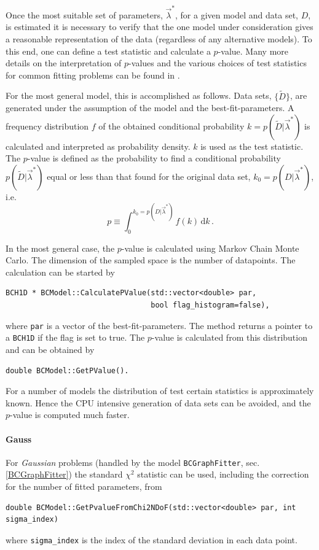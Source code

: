 \documentclass[11pt, a4paper]{article}
\begin{document}
Once the most suitable set of parameters, $\vec{\lambda}^{*}$, for a
given model and data set, $D$, is estimated it is necessary
to verify that the one  model under consideration
gives a reasonable representation of the data
(regardless of any alternative models). To this end, one can
define a test statistic and calculate a $p$-value. Many more
details on the interpretation of $p$-values and the various
choices of test statistics for common fitting problems can be found
in \cite{BAT_pValue}.

For the most general model, this is accomplished as follows.
Data sets, $\{ \tilde{D} \}$, are generated under the
assumption of the model and the best-fit-parameters. A frequency
distribution $f$ of the obtained conditional probability
$k=p(\tilde{D}|\vec{\lambda}^{*})$ is calculated and interpreted as
probability density. $k$ is used as the test statistic.
The $p$-value is defined as the probability to
find a conditional probability $p(\tilde{D}|\vec{\lambda}^{*})$ equal
or less than that found for the original data set,
$k_{0}=p(D|\vec{\lambda}^{*})$, i.e.
%
\begin{equation}
p \equiv  \int_{0}^{k_{0}=p(D|\vec{\lambda}^{*})} f(k) \, \mathrm{d}k \, .
\end{equation}

In the most general case, the $p$-value is calculated using Markov
Chain Monte Carlo. The dimension of the sampled space is the number
of datapoints.
 The calculation can be started by
%
\begin{verbatim}
BCH1D * BCModel::CalculatePValue(std::vector<double> par,
                                 bool flag_histogram=false),
\end{verbatim}
%
where \verb|par| is a vector of the best-fit-parameters. The method
returns a pointer to a \verb|BCH1D| if the flag is set to true. The
$p$-value is calculated from this distribution and can be obtained by
%
\begin{verbatim}
double BCModel::GetPValue().
\end{verbatim}

For a number of models the distribution of test certain statistics is
approximately known. Hence the CPU intensive generation of data sets
can be avoided, and the $p$-value is computed much faster.

\paragraph{Gauss} For \textit{Gaussian} problems (handled by the model
\verb|BCGraphFitter|, sec. \ref{BCGraphFitter}) the standard $\chi^2$
statistic can be used, including the correction for the number of
fitted parameters, from
%
\begin{verbatim}
double BCModel::GetPvalueFromChi2NDoF(std::vector<double> par, int sigma_index)
\end{verbatim}
%
where \verb|sigma_index| is the index of the standard deviation in
each data point.
\end{document}
